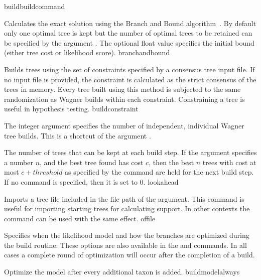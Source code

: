 \begin{command}{build}{buildcommand}
\begin{arguments}
{Calculates the exact solution using the Branch and Bound 
algorithm~\cite{hendy1982}. By default only one optimal tree is kept but
the number of optimal trees to be retained can be specified by the
argument . The optional float value specifies the
initial bound (either tree cost or likelihood score).}
{branchandbound} 

{Builds trees using the set of constraints specified by a consensus
tree input file. If no input file is provided, the constraint is
calculated as the strict consensus of the trees in memory. Every
tree built using this method is subjected to the same randomization
as Wagner builds within each constraint. Constraining a tree is
useful in hypothesis testing.} {buildconstraint}

{The integer argument specifies the number of independent, individual
Wagner tree builds. This is a shortcut of the argument .}
{}

{The number of trees that can be kept at each build step. If the
 argument specifies a number $n$, and the
best tree found has cost $c$, then the best $n$ trees with cost at
most $c + threshold$ as specified by the
 command are held for the next
build step. If no  command is specified,
then it is set to $0$.} {lookahead}

{Imports a tree file included in the file path of the argument.
This command is useful for importing starting trees for calculating
 support. In other contexts the command 
can be used with the same effect.} {offile}

{Specifies when the likelihood model and how the branches are
optimized during the build routine. These options are also available
in the  and  commands. In all
cases a complete round of optimization will occur after the completion
of a build.

\begin{description}

{Optimize the model after every additional taxon is added.}
{buildmodelalways}


\end{description}}
\end{arguments}
\end{command}
